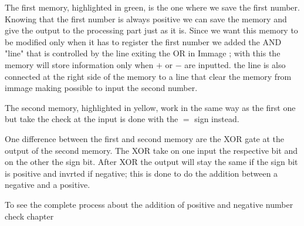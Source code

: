 \documentclass{article}
\begin{document}

\vspace{3mm}

The first memory, highlighted in green, is the one where we save the first number. 
Knowing that the first number is always positive we can save the memory and give the output to the processing part just as it is. 
Since we want this memory to be modified only when it has to register the first number we added the AND "line" that is controlled by the line exiting the OR in Immage%
; with this the memory will store information only when $+$ or $-$ are inputted. the line is also connected at the right side of the memory to a line that clear the memory from immage%
 making possible to input the second number.

\vspace{3mm}

The second memory, highlighted in yellow, work in the same way as the first one but take the check at the input is done with the $=$ sign instead.

One difference between the first and second memory are the XOR gate at the output of the second memory. The XOR take on one input the respective bit and on the other the sign bit. After XOR the output will stay the same if the sign bit is positive and invrted if negative; this is done to do the addition between a negative and a positive. 

\vspace{3mm}

To see the complete process about the addition of positive and negative number check chapter %
\end{document}
